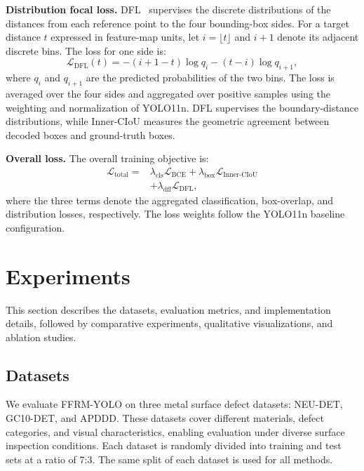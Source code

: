 \documentclass[pdflatex,sn-nature]{sn-jnl}
\begin{document}
\noindent\textbf{Distribution focal loss.}
DFL~\cite{Li2020GFL} supervises the discrete distributions of the distances from each reference point to the four bounding-box sides. For a target distance $t$ expressed in feature-map units, let $i=\lfloor t\rfloor$ and $i+1$ denote its adjacent discrete bins. The loss for one side is:
\begin{equation}
\mathcal{L}_{\mathrm{DFL}}(t)
=
-(i+1-t)\log q_i
-(t-i)\log q_{i+1},
\label{eq:dfl}
\end{equation}
where $q_i$ and $q_{i+1}$ are the predicted probabilities of the two bins. The loss is averaged over the four sides and aggregated over positive samples using the weighting and normalization of YOLO11n. DFL supervises the boundary-distance distributions, while Inner-CIoU measures the geometric agreement between decoded boxes and ground-truth boxes.

\noindent\textbf{Overall loss.}
The overall training objective is:
\begin{equation}
\begin{aligned}
\mathcal{L}_{\mathrm{total}}
={}&
\lambda_{\mathrm{cls}}\mathcal{L}_{\mathrm{BCE}}
+
\lambda_{\mathrm{box}}\mathcal{L}_{\mathrm{Inner\text{-}CIoU}} \\
&+
\lambda_{\mathrm{dfl}}\mathcal{L}_{\mathrm{DFL}},
\end{aligned}
\label{eq:total_loss}
\end{equation}
where the three terms denote the aggregated classification, box-overlap, and distribution losses, respectively. The loss weights follow the YOLO11n baseline configuration.

\section{Experiments}\label{sec:experiments}

This section describes the datasets, evaluation metrics, and implementation details, followed by comparative experiments, qualitative visualizations, and ablation studies.

\subsection{Datasets}
We evaluate FFRM-YOLO on three metal surface defect datasets: NEU-DET, GC10-DET, and APDDD. These datasets cover different materials, defect categories, and visual characteristics, enabling evaluation under diverse surface inspection conditions. Each dataset is randomly divided into training and test sets at a ratio of 7:3. The same split of each dataset is used for all methods.
\end{document}

